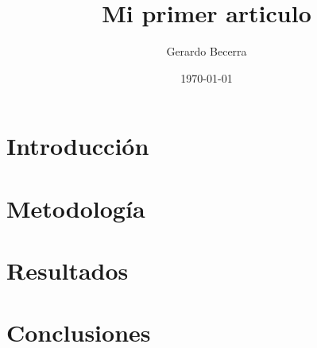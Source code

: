 \documentclass{article}
\title{Mi primer articulo}
\author{Gerardo Becerra}
\date{\today}
\begin{document}
	\maketitle

	\begin{abstract}
		\lipsum[1]
	\end{abstract}

	\section{Introducción}
	\lipsum[1-4]

	\section{Metodología}
	\lipsum[1-4]
	
	\section{Resultados}
	\lipsum[1-4]
	
	\section{Conclusiones}
	\lipsum[1-4]
	
\end{document}
